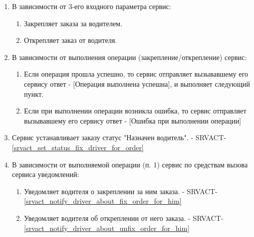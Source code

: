         \begin{alg} \label{alg_order_fastening} \mbox{}

	        \begin{enumerate}

	          \item В зависимости от 3-его входного параметра сервис:

              \begin{enumerate}
                \item Закрепляет заказа за водителем.
                \item Открепляет заказ от водителя.
              \end{enumerate}
	          
	          \item В зависимости от выполнения операции (закрепление/открепление) сервис:

              \begin{enumerate}
                \item Если операция прошла успешно, то сервис отправляет вызывавшему его сервису ответ - [Операция выполнена успешна], и выполняет следующий пункт.
                \item Если  при выполнении операции возникла ошибка, то сервис отправляет вызывавшему его сервису ответ - [Ошибка при выполнении операции]
              \end{enumerate}

            \item Сервис устанавливает заказу статус "Назначен водитель". - SRVACT-\ref{srvact_set_status_fix_driver_for_order}

            \item В зависимости от выполняемой операции (п. 1) сервис по средствам вызова сервиса уведомлений:

              \begin{enumerate}

                \item Уведомляет водителя о закреплении за ним заказа. - SRVACT-\ref{srvact_notify_driver_about_fix_order_for_him}

                \item Уведомляет водителя об откреплении от него заказа. - SRVACT-\ref{srvact_notify_driver_about_unfix_order_for_him}

              \end{enumerate}

	        \end{enumerate}

        	\end{alg}

